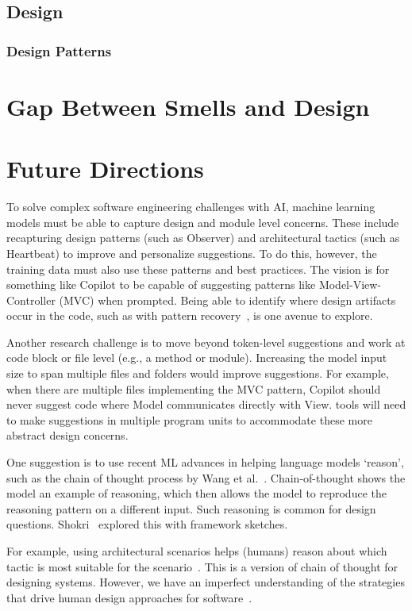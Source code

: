 \subsection{Design}
\label{design}


\subsubsection{Design Patterns}
\label{patterns}

\section{Gap Between Smells and Design}
\label{gap}

\section{Future Directions}
\label{future}
To solve complex software engineering challenges with AI, machine learning models must be able to capture design and module level concerns. 
These include recapturing design patterns (such as Observer) and architectural tactics (such as Heartbeat) to improve and personalize suggestions. 
To do this, however, the training data must also use these patterns and best practices.
The vision is for something like Copilot to be capable of suggesting patterns like Model-View-Controller (MVC) when prompted. 
Being able to identify where design artifacts occur in the code, such as with pattern recovery~\cite{Keim2020}, is one avenue to explore. 

Another research challenge is to move beyond token-level suggestions and work at code block or file level (e.g., a method or module). 
Increasing the model input size to span multiple files and folders would improve suggestions. For example, when there are multiple files implementing the MVC pattern, Copilot should never suggest code where \textsf{Model} communicates directly with \textsf{View}. 
\AISE{} tools will need to make suggestions in multiple program units to accommodate these more abstract design concerns.

One suggestion is to use recent ML advances in helping language models `reason', such as the chain of thought process by Wang et al.~\cite{chain_of_thought}. 
Chain-of-thought shows the model an example of reasoning, which then allows the model to reproduce the reasoning pattern on a different input.
Such reasoning is common for design questions. 
Shokri~\cite{shokri21} explored this with framework sketches.

For example, using architectural scenarios helps (humans) reason about which tactic is most suitable for the scenario~\cite{kazman98}. This is a version of chain of thought for designing systems. 
However, we have an imperfect understanding of the strategies that drive human design approaches for software~\cite{Arab2022}. 